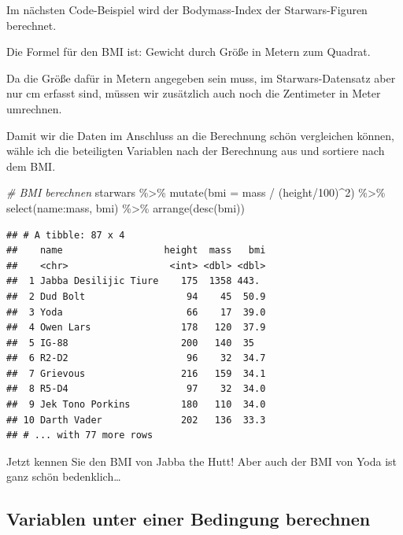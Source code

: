 \documentclass[
]{book}
\newenvironment{Shaded}{\begin{snugshade}}{\end{snugshade}}
\newcommand{\AttributeTok}[1]{\textcolor[rgb]{0.77,0.63,0.00}{#1}}
\newcommand{\CommentTok}[1]{\textcolor[rgb]{0.56,0.35,0.01}{\textit{#1}}}
\newcommand{\DecValTok}[1]{\textcolor[rgb]{0.00,0.00,0.81}{#1}}
\newcommand{\FunctionTok}[1]{\textcolor[rgb]{0.00,0.00,0.00}{#1}}
\newcommand{\NormalTok}[1]{#1}
\newcommand{\SpecialCharTok}[1]{\textcolor[rgb]{0.00,0.00,0.00}{#1}}
\begin{document}
Im nächsten Code-Beispiel wird der Bodymass-Index der Starwars-Figuren berechnet.

Die Formel für den BMI ist:
Gewicht durch Größe in Metern zum Quadrat.

Da die Größe dafür in Metern angegeben sein muss, im Starwars-Datensatz aber nur cm erfasst sind, müssen wir zusätzlich auch noch die Zentimeter in Meter umrechnen.

Damit wir die Daten im Anschluss an die Berechnung schön vergleichen können, wähle ich die beteiligten Variablen nach der Berechnung aus und sortiere nach dem BMI.

\begin{Shaded}
\begin{Highlighting}[]
\CommentTok{\# BMI berechnen}
\NormalTok{starwars }\SpecialCharTok{\%\textgreater{}\%} 
  \FunctionTok{mutate}\NormalTok{(}\AttributeTok{bmi =}\NormalTok{ mass }\SpecialCharTok{/}\NormalTok{ (height}\SpecialCharTok{/}\DecValTok{100}\NormalTok{)}\SpecialCharTok{\^{}}\DecValTok{2}\NormalTok{) }\SpecialCharTok{\%\textgreater{}\%} 
  \FunctionTok{select}\NormalTok{(name}\SpecialCharTok{:}\NormalTok{mass, bmi) }\SpecialCharTok{\%\textgreater{}\%} 
  \FunctionTok{arrange}\NormalTok{(}\FunctionTok{desc}\NormalTok{(bmi))}
\end{Highlighting}
\end{Shaded}

\begin{verbatim}
## # A tibble: 87 x 4
##    name                  height  mass   bmi
##    <chr>                  <int> <dbl> <dbl>
##  1 Jabba Desilijic Tiure    175  1358 443. 
##  2 Dud Bolt                  94    45  50.9
##  3 Yoda                      66    17  39.0
##  4 Owen Lars                178   120  37.9
##  5 IG-88                    200   140  35  
##  6 R2-D2                     96    32  34.7
##  7 Grievous                 216   159  34.1
##  8 R5-D4                     97    32  34.0
##  9 Jek Tono Porkins         180   110  34.0
## 10 Darth Vader              202   136  33.3
## # ... with 77 more rows
\end{verbatim}

Jetzt kennen Sie den BMI von Jabba the Hutt! Aber auch der BMI von Yoda ist ganz schön bedenklich\ldots{}

\hypertarget{variablen-unter-einer-bedingung-berechnen}{%
\subsection{Variablen unter einer Bedingung berechnen}\label{variablen-unter-einer-bedingung-berechnen}}
\end{document}
